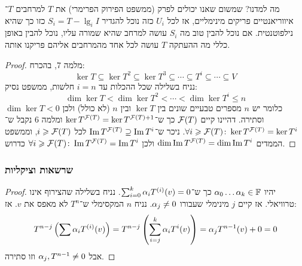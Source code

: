 \documentclass[name=רשימות אלגברה לינארית 2א]{../../../tex/classes/megasumPreamble}
\begin{document}
	מה למדנו? שמשום שאנו יכולים לפרק (ממשפט הפירוק הפרימרי) את $T$ למרחבים $T$־איווריאנטיים פריקים מינימליים, אז לכל $U_i$ כזה נוכל להגדיר $S_i = T - \lg_i I$ כזו כך שהיא נילפוטנטית. אם נוכל להבין טוב מה $S_i$ עושה למרחב שהיא שמורה עליו, נוכל להבין באופן כללי מה ההעתקה $T$ עושה לכל אחד מהמרחבים אליהם פריקנו אותה. 	
	
	
	\begin{proof}
		מלמה $7$, בהכרח: 
		\[ \ker T \subseteq \ker T^{2} \subseteq \ker T^{3} \subseteq \cdots \subseteq T^{i} \subseteq \cdots \subseteq V \]
		נניח בשלילה שכל ההכלות עד $i = n$ חלשות, ממשפט נסיק: 
		\[ \dim \ker T < \dim \ker T^{2} < \cdots < \dim \ker T^{i} \le n \]
		כלומר יש $n$ מספרים טבעיים שונים בין $\ker T$ ובין $n$ (לא כולל) ולכן $\dim \ker T < 0$ וסתירה. דהיינו קיים $\mathcal{F}(T)$ כך ש־$\ker T^{\mathcal{F}(T)} = \ker T^{\mathcal{F}(T) + 1}$ ומלמה $6$ נקבל ש־$\forall i \geqslant \mathcal{F}(T) \colon \ker T^{\mathcal{F}(T)}  = \ker T^{i}$. ניכר ש־$\operatorname{Im} T^{\mathcal{F}(T)} \supseteq \operatorname{Im} T^{i}$ לכל $i \geqslant \mathcal{F}(T)$, וממשפט הממדים $\dim \operatorname{Im} T^{\mathcal{F}(T)}  = \dim \operatorname{Im} T^{i}$ ולכן $\forall i \geqslant \mathcal{F}(T) \colon \operatorname{Im} T^{\mathcal{F}(T)} = \operatorname{Im} T^{i}$ כדרוש. 
	\end{proof}
	
	
	\subsubsection{שרשאות וציקליות}
	
	
	\begin{proof}
		יהיו $\alpha_0 \dots \alpha_k \in \mathbb{F}$ כך ש־$\sum_{i = 0}^{k}\alpha_i T^{(i)}(v) = 0$. נניח בשלילה שהצירוף אינו טרוויאלי. אז קיים $j$ מינימלי שעבורו $\alpha_j \neq 0$. נניח $n$ המקסימלי ש־$T^{n}$ לא מאפס את $v$. אז: 
		\[ T^{n - j}\left ( \sum \alpha_i T^{(i)}(v) \right ) = T^{n - j}\left ( \sum_{i = j}^{k}\alpha_iT^{i}(v) \right ) = \alpha_jT^{n - 1}(v) + 0 = 0 \]
		אבל $\alpha_j, T^{n - 1} \neq 0$ וזו סתירה. 
	\end{proof}
	
\end{document}
